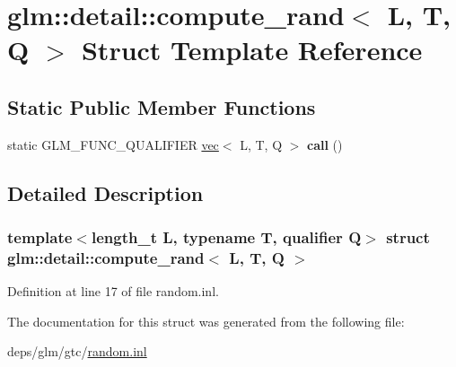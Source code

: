 \hypertarget{structglm_1_1detail_1_1compute__rand}{}\section{glm\+:\+:detail\+:\+:compute\+\_\+rand$<$ L, T, Q $>$ Struct Template Reference}
\label{structglm_1_1detail_1_1compute__rand}
\subsection*{Static Public Member Functions}
\begin{DoxyCompactItemize}
\item 
\mbox{\label{structglm_1_1detail_1_1compute__rand_a7c4855eeb77b83d066abf7ffc1398724}} 
static G\+L\+M\+\_\+\+F\+U\+N\+C\+\_\+\+Q\+U\+A\+L\+I\+F\+I\+ER \hyperlink{structglm_1_1vec}{vec}$<$ L, T, Q $>$ {\bfseries call} ()
\end{DoxyCompactItemize}


\subsection{Detailed Description}
\subsubsection*{template$<$length\+\_\+t L, typename T, qualifier Q$>$\newline
struct glm\+::detail\+::compute\+\_\+rand$<$ L, T, Q $>$}



Definition at line 17 of file random.\+inl.



The documentation for this struct was generated from the following file\+:\begin{DoxyCompactItemize}
\item 
deps/glm/gtc/\hyperlink{random_8inl}{random.\+inl}\end{DoxyCompactItemize}
